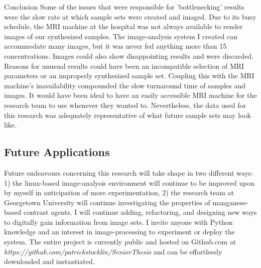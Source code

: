 \documentclass[a4paper,12pt]{article}
\begin{document}
\begin{section}{Conclusion}
Some of the issues that were responsible for 'bottlenecking' results were the slow rate at which sample sets were created and imaged. Due to its busy schedule, the MRI machine at the hospital was not always available to render images of our synthesized samples. The image-analysis system I created can accommodate many images, but it was never fed anything more than 15 concentrations. Images could also show disappointing results and were discarded. Reasons for unusual results could have been an incompatible selection of MRI parameters or an improperly synthesized sample set. Coupling this with the MRI machine's inavailability compounded the slow turnaround time of samples and images. It would have been ideal to have an easily accessible MRI machine for the research team to use whenever they wanted to. Nevertheless, the data used for this research was adequately representative of what future sample sets may look like.

\subsection{Future Applications}

Future endeavours concerning this research will take shape in two different ways: 1) the linux-based image-analysis environment will continue to be improved upon by myself in anticipation of more experimentation, 2) the research team at Georgetown University will continue investigating the properties of manganese-based contrast agents. I will continue adding, refactoring, and designing new ways to digitally gain information from image sets. I invite anyone with Python knowledge and an interest in image-processing to experiment or deploy the system. The entire project is currently public and hosted on Github.com at \\
{\em https://github.com/patrickstocklin/SeniorThesis} and can be effortlessly downloaded and instantiated.


\end{section}
\end{document}
